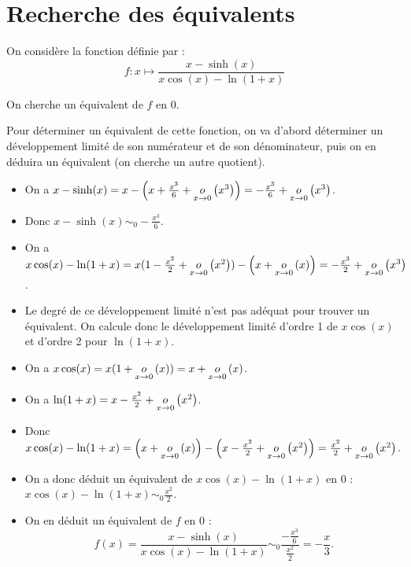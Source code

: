 \documentclass[12pt, a4paper]{report}
\begin{document}
\section{Recherche des équivalents}

\begin{example}
    On considère la fonction définie par :
    $$f:x\mapsto \frac{x-\sinh(x)}{x\cos(x)-\ln(1+x)}$$
    
    On cherche un équivalent de $f$ en $0$.

    \begin{methodbox}
        Pour déterminer un équivalent de cette fonction, on va d'abord déterminer un développement limité de son numérateur et de son dénominateur, puis on en déduira un équivalent (on cherche un autre quotient).
    \end{methodbox}

    \begin{itemize}
        \item On a $x-\sinh(x) = x - \left(x + \frac{x^3}{6} + \underset{x\to0}{o}\left(x^3\right)\right) = -\frac{x^3}{6} + \underset{x\to0}{o}\left(x^3\right)$.
        \item Donc $x-\sinh(x) \sim_{0} -\frac{x^3}{6}$.
        \item On a $x\cos(x)-\ln(1+x) = x(1 - \frac{x^2}{2} + \underset{x\to0}{o}\left(x^2\right)) - \left(x+\underset{x\to0}{o}\left(x\right)\right) = -\frac{x^3}{2} + \underset{x\to0}{o}\left(x^3\right)$.
        \item Le degré de ce développement limité n'est pas adéquat pour trouver un équivalent. On calcule donc le développement limité d'ordre 1 de $x\cos(x)$ et d'ordre 2 pour $\ln(1+x)$.
        \item On a $x\cos(x) = x(1 + \underset{x\to0}{o}\left(x\right)) = x + \underset{x\to0}{o}\left(x\right)$.
        \item On a $\ln(1+x) = x - \frac{x^2}{2} + \underset{x\to0}{o}\left(x^2\right)$.
        \item Donc $x\cos(x)-\ln(1+x) = \left(x + \underset{x\to0}{o}\left(x\right)\right) - \left(x - \frac{x^2}{2} + \underset{x\to0}{o}\left(x^2\right)\right) = \frac{x^2}{2} + \underset{x\to0}{o}\left(x^2\right)$.
        \item On a donc déduit un équivalent de $x\cos(x)-\ln(1+x)$ en $0$ : $x\cos(x)-\ln(1+x) \sim_{0} \frac{x^2}{2}$.
        \item On en déduit un équivalent de $f$ en $0$ :
        $$f(x) = \frac{x-\sinh(x)}{x\cos(x)-\ln(1+x)} \sim_{0} \frac{-\frac{x^3}{6}}{\frac{x^2}{2}} = -\frac{x}{3}.$$
    \end{itemize}
    
\end{example}
\end{document}
